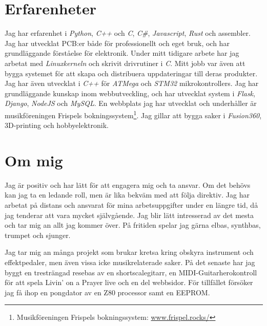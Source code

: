 \documentclass{article}
\begin{document}
\section{Erfarenheter}
Jag har erfarenhet i \textit{Python}, \textit{C++} och \textit{C}, \textit{C\#}, \textit{Javascript}, \textit{Rust} och assembler. 
Jag har utvecklat PCB:er både för professionellt och eget bruk, och har grundläggande förståelse för elektronik.
Under mitt tidigare arbete har jag arbetat med \textit{Linuxkerneln} och skrivit drivrutiner i \textit{C}.
Mitt jobb var även att bygga systemet för att skapa och distribuera uppdateringar till deras produkter.
Jag har även utvecklat i \textit{C++} för \textit{ATMega} och \textit{STM32} mikrokontrollers. Jag har grundläggande kunskap inom webbutveckling,
och har utvecklat system i \textit{Flask}, \textit{Django}, \textit{NodeJS} och \textit{MySQL}. En webbplats jag har utvecklat och 
underhåller är musikföreningen Frispels bokningssystem\footnote{Musikföreningen Frispels bokningssystem: \url{www.frispel.rocks/}}.
Jag gillar att bygga saker i \textit{Fusion360}, 3D-printing och hobbyelektronik.
\newpage
%
\section{Om mig}
Jag är positiv och har lätt för att engagera mig och ta ansvar. 
Om det behövs kan jag ta en ledande roll, men är lika bekväm med att följa direktiv. 
Jag har arbetat på distans och ansvarat för mina arbetsuppgifter under en längre tid, då jag tenderar att vara mycket självgående.
Jag blir lätt intresserad av det mesta och tar mig an allt jag kommer över.
På fritiden spelar jag gärna elbas, synthbas, trumpet och sjunger.

Jag tar mig an många projekt som brukar kretsa kring obskyra instrument och effektpedaler, men även vissa icke musikrelaterade saker.
På det senaste har jag byggt en tresträngad resebas av en shortscalegitarr, en MIDI-Guitarherokontroll för att spela Livin' on a Prayer
live och en del webbsidor. För tillfället försöker jag få ihop en pongdator av en Z80 processor samt en EEPROM.
\end{document}
